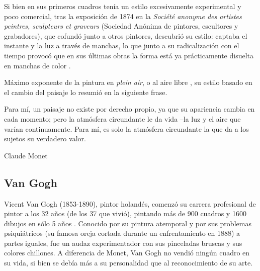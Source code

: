 \documentclass[../main.tex]{subfiles}
\begin{document}
Si bien en sus primeros cuadros tenía un estilo excesivamente experimental y poco comercial, tras la exposición de 1874 en la \textit{Société anonyme des artistes peintres, sculpteurs et graveurs} (Sociedad Anónima de pintores, escultores y grabadores), que cofundó junto a otros pintores, descubrió su estilo: captaba el instante y la luz a través de manchas, lo que junto a su radicalización con el tiempo provocó que en sus últimas obras la forma está ya prácticamente disuelta en manchas de color \cite{CalvoSantos2016}.

Máximo exponente de la pintura en \textit{plein air}, o al aire libre \cite{Sienra2019}, su estilo basado en el cambio del paisaje lo resumió en la siguiente frase.

 \begin{center}
    \begin{minipage}{0.9\linewidth}
        \vspace{5pt}%
        {\small
            Para mí, un paisaje no existe por derecho propio, ya que su apariencia cambia en cada momento; pero la atmósfera circundante le da vida –la luz y el aire que varían continuamente. Para mí, es solo la atmósfera circundante la que da a los sujetos su verdadero valor.
        }
        \begin{flushright}
            Claude Monet \cite{Sienra2019}
        \end{flushright}
        \vspace{3pt}%
    \end{minipage}
\end{center}

\subsection{Van Gogh}

Vicent Van Gogh (1853-1890), pintor holandés, comenzó su carrera profesional de pintor a los 32 años (de los 37 que vivió), pintando más de 900 cuadros y 1600 dibujos en sólo 5 años \cite{CalvoSantos2016-2}. Conocido por su pintura atemporal y por sus problemas psiquiátricos (su famosa oreja cortada durante un enfrentamiento en 1888) a partes iguales, fue un audaz experimentador con sus pinceladas bruscas y sus colores chillones. A diferencia de Monet, Van Gogh no vendió ningún cuadro en su vida, si bien se debía más a su personalidad que al reconocimiento de su arte. 
\end{document}
